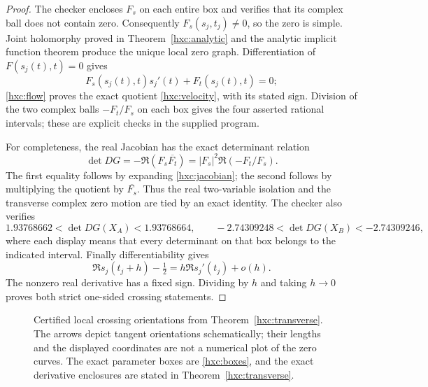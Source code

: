 \begin{proof}
The checker encloses \(F_s\) on each entire box and verifies that its
complex ball does not contain zero. Consequently
\(F_s(s_j,t_j)\ne0\), so the zero is simple. Joint holomorphy proved
in Theorem~\ref{hxc:analytic} and the analytic implicit function theorem
produce the unique local zero graph. Differentiation of
\(F(s_j(t),t)=0\) gives
\[
 F_s(s_j(t),t)s_j'(t)+F_t(s_j(t),t)=0;
\]
\eqref{hxc:flow} proves the exact quotient
\eqref{hxc:velocity}, with its stated sign. Division of the two
complex balls \(-F_t/F_s\) on each box gives the four asserted rational
intervals; these are explicit checks in the supplied program.

For completeness, the real Jacobian has the exact determinant relation
\begin{equation}\label{hxc:detvelocity}
 \det DG=-\Re(F_s\overline{F_t})
       =|F_s|^2\Re(-F_t/F_s).
\end{equation}
The first equality follows by expanding \eqref{hxc:jacobian}; the
second follows by multiplying the quotient by \(\overline{F_s}\).
Thus the real two-variable isolation and the transverse complex zero
motion are tied by an exact identity. The checker also verifies
\[
 1.93768662<\det DG(X_A)<1.93768664,
 \qquad
 -2.74309248<\det DG(X_B)<-2.74309246,
\]
where each display means that every determinant on that box belongs
to the indicated interval. Finally differentiability gives
\[
 \Re s_j(t_j+h)-\tfrac12=h\Re s_j'(t_j)+o(h).
\]
The nonzero real derivative has a fixed sign. Dividing by \(h\) and
taking \(h\to0\) proves both strict one-sided crossing statements.
\end{proof}

\begin{figure}[ht]
\centering
{}
\caption{Certified local crossing orientations from
Theorem~\ref{hxc:transverse}. The arrows depict tangent orientations
schematically; their lengths and the displayed coordinates are not a
numerical plot of the zero curves. The exact parameter boxes are
\eqref{hxc:boxes}, and the exact derivative enclosures are stated in
Theorem~\ref{hxc:transverse}.}
\end{figure}

